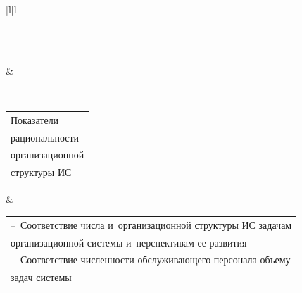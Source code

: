 \begin{table}\small

\begin{center}



\tabcolsep=3.85pt

\begin{tabular}{|l|l|}


\\

\\[-6pt]

\hline

  &

\\

  \hline

\tabcolsep=0pt \begin{tabular}{l} Показатели\\ рациональности\\ 

организационной\\ структуры ИС \end{tabular}

&\tabcolsep=0pt \begin{tabular}{l}

--~Соответствие числа и~организационной структуры ИС задачам\\

\hphantom{--~}организационной системы и~перспективам ее развития\\

--~Соответствие численности обслуживающего персонала объему\\ 

\hphantom{--~}задач системы\\


\end{tabular}
\end{tabular}
\end{center}
\end{table}
